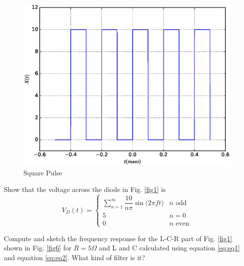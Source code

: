 \documentclass[journal,12pt,twocolumn]{IEEEtran}
\begin{document}
\begin{figure}[h]
	\includegraphics[scale=0.5]{./figs/square.eps}
	\caption{Square Pulse} \label{fig5}
    \end{figure}
\begin{problem}
Show that the voltage across the diode in Fig. \ref{fig1} is
%
\begin{equation}
V_D(t) =
\begin{cases}
  \sum_{n=1}^{\infty} \dfrac{10}{n \pi} \sin \Big (2\pi ft \Big ) & n \text{ odd}
 \\
 5   & n = 0
 \\
 0 & n \text{ even}
 \end{cases}
\end{equation}

\end{problem}
\begin{problem}
Compute  and sketch the frequency response for the L-C-R part of Fig. \ref{fig1} shown in Fig. \ref{fig6} for $R = 5 \Omega$ and L and C calculated using  equation \eqref{eq:eq1} and  equation \eqref{eq:eq2}. What kind of filter is it?
\end{problem}
\end{document}
